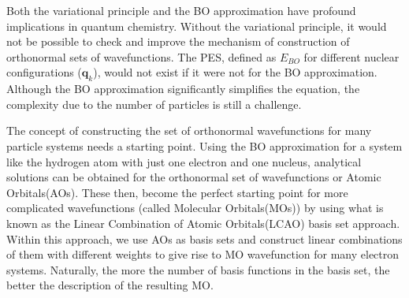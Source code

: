            Both the variational principle and the BO approximation have profound implications in quantum chemistry. Without the variational principle, it would not be possible to check and improve the mechanism of construction of orthonormal sets of wavefunctions. The PES, defined as $E_{BO}$ for different nuclear configurations ($\mathbf{q}_k$), would not exist if it were not for the BO approximation. Although the BO approximation significantly simplifies the \Schrodinger{} equation, the complexity due to the number of particles is still a challenge.

            The concept of constructing the set of orthonormal wavefunctions for many particle systems needs a starting point. Using the BO approximation for a system like the hydrogen atom with just one electron and one nucleus, analytical solutions can be obtained for the orthonormal set of wavefunctions or Atomic Orbitals(AOs). These then, become the perfect starting point for more complicated wavefunctions (called Molecular Orbitals(MOs)) by using what is known as the Linear Combination of Atomic Orbitals(LCAO) basis set approach. Within this approach, we use AOs as basis sets and construct linear combinations of them with different weights to give rise to MO wavefunction for many electron systems. Naturally, the more the number of basis functions in the basis set, the better the description of the resulting MO.

